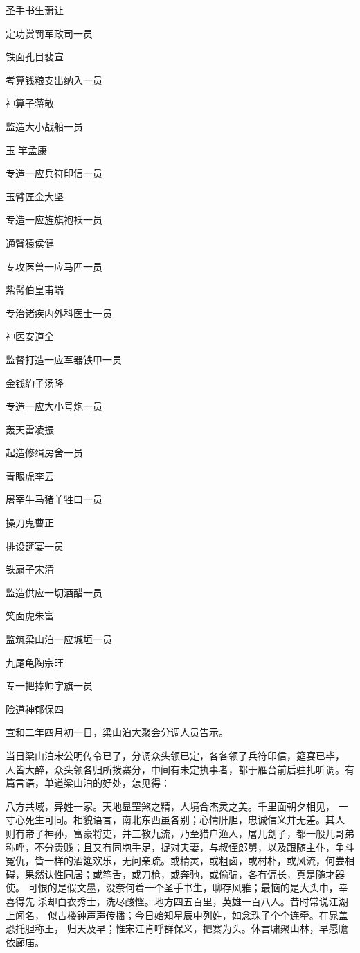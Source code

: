 圣手书生萧让

定功赏罚军政司一员

铁面孔目裴宣

考算钱粮支出纳入一员

神算子蒋敬

监造大小战船一员


玉竿孟康

专造一应兵符印信一员

玉臂匠金大坚

专造一应旌旗袍袄一员

通臂猿侯健

专攻医兽一应马匹一员

紫髯伯皇甫端

专治诸疾内外科医士一员

神医安道全

监督打造一应军器铁甲一员

金钱豹子汤隆

专造一应大小号炮一员

轰天雷凌振

起造修缉房舍一员


青眼虎李云

屠宰牛马猪羊牲口一员

操刀鬼曹正

排设筵宴一员


铁扇子宋清

监造供应一切酒醋一员

笑面虎朱富

监筑梁山泊一应城垣一员

九尾龟陶宗旺

专一把捧帅字旗一员

险道神郁保四

宣和二年四月初一日，梁山泊大聚会分调人员告示。

当日梁山泊宋公明传令已了，分调众头领已定，各各领了兵符印信，筵宴已毕，
人皆大醉，众头领各归所拨寨分，中间有未定执事者，都于雁台前后驻扎听调。有
篇言语，单道梁山泊的好处，怎见得：

八方共域，异姓一家。天地显罡煞之精，人境合杰灵之美。千里面朝夕相见，
一寸心死生可同。相貌语言，南北东西虽各别；心情肝胆，忠诚信义并无差。其人
则有帝子神孙，富豪将吏，并三教九流，乃至猎户渔人，屠儿刽子，都一般儿哥弟
称呼，不分贵贱；且又有同胞手足，捉对夫妻，与叔侄郎舅，以及跟随主仆，争斗
冤仇，皆一样的酒筵欢乐，无问亲疏。或精灵，或粗卤，或村朴，或风流，何尝相
碍，果然认性同居；或笔舌，或刀枪，或奔驰，或偷骗，各有偏长，真是随才器使。
可恨的是假文墨，没奈何着一个圣手书生，聊存风雅；最恼的是大头巾，幸喜得先
杀却白衣秀士，洗尽酸悭。地方四五百里，英雄一百八人。昔时常说江湖上闻名，
似古楼钟声声传播；今日始知星辰中列姓，如念珠子个个连牵。在晁盖恐托胆称王，
归天及早；惟宋江肯呼群保义，把寨为头。休言啸聚山林，早愿瞻依廊庙。

